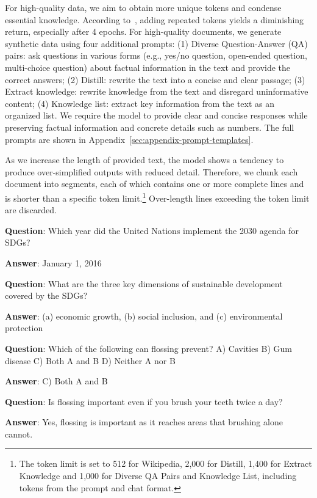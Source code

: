 \documentclass[11pt]{article}
\begin{document}
For high-quality data, we aim to obtain more unique tokens and condense essential knowledge. According to~\citep{muennighoff2024scaling}, adding repeated tokens yields a diminishing return, especially after 4 epochs.
For high-quality documents, we generate synthetic data using four additional prompts:
(1) \textrm{Diverse Question-Answer (QA) pairs}: ask questions in various forms (e.g., yes/no question, open-ended question, multi-choice question) about factual information in the text and provide the correct answers;
(2) \textrm{Distill}: rewrite the text into a concise and clear passage;
(3) \textrm{Extract knowledge}: rewrite knowledge from the text and disregard uninformative content;
(4) \textrm{Knowledge list}: extract key information from the text as an organized list.
We require the model to provide clear and concise responses while preserving factual information and concrete details such as numbers.
The full prompts are shown in Appendix~\ref{sec:appendix-prompt-templates}.

As we increase the length of provided text, the model shows a tendency to produce over-simplified outputs with reduced detail. Therefore, we chunk each document into segments, each of which contains one or more complete lines and is shorter than a specific token limit.\footnote{The token limit is set to 512 for \textrm{Wikipedia}, 2,000 for \textrm{Distill}, 1,400 for \textrm{Extract Knowledge} and 1,000 for \textrm{Diverse QA Pairs} and \textrm{Knowledge List}, including tokens from the prompt and chat format.} Over-length lines exceeding the token limit are discarded.

\begin{tcolorbox}[boxsep=0mm,left=1mm,right=1mm,top=1mm,bottom=1mm,fontupper=\small\ttfamily,halign=left,arc=0mm,boxrule=1pt,colback=gray!10]
\textbf{Question}: Which year did the United Nations implement the 2030 agenda for SDGs?

\textbf{Answer}: January 1, 2016

\vspace{4pt}

\textbf{Question}: What are the three key dimensions of sustainable development covered by the SDGs?

\textbf{Answer}: (a) economic growth, (b) social inclusion, and (c) environmental protection

\vspace{4pt}

\textbf{Question}: Which of the following can flossing prevent? A) Cavities B) Gum disease C) Both A and B D) Neither A nor B

\textbf{Answer}: C) Both A and B

\vspace{4pt}

\textbf{Question}: Is flossing important even if you brush your teeth twice a day?

\textbf{Answer}: Yes, flossing is important as it reaches areas that brushing alone cannot.
\end{tcolorbox}
\noindent\begin{minipage}{\linewidth}
\end{minipage}
\end{document}
